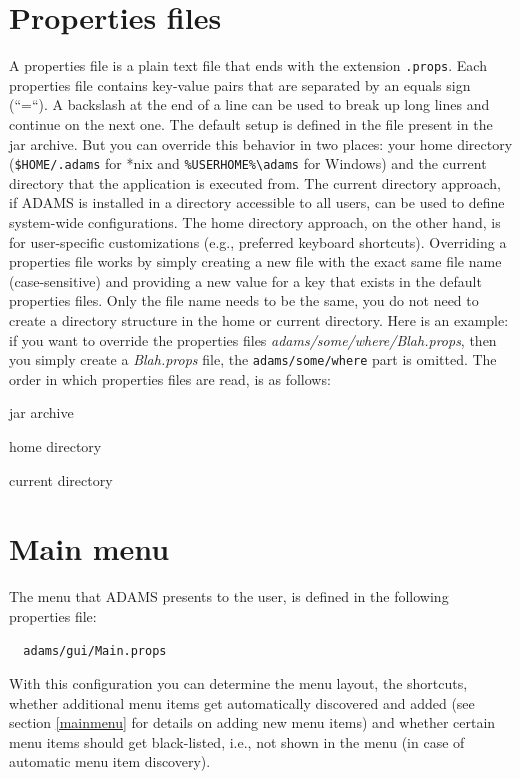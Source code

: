 \section{Properties files}
A properties file is a plain text file that ends with the extension
\texttt{.props}. Each properties file contains key-value pairs that are
separated by an equals sign (``=``). A backslash at the end of a line can be
used to break up long lines and continue on the next one. The default setup is
defined in the file present in the jar archive. But you can override this
behavior in two places:
your home directory (\texttt{\$HOME/.adams} for *nix and
\texttt{\%USERHOME\%\textbackslash adams} for Windows) and the current directory
that the application is executed from. The current directory approach, if ADAMS
is installed in a directory accessible to all users, can be used to define
system-wide configurations. The home directory approach, on the other hand, is
for user-specific customizations (e.g., preferred keyboard shortcuts).
Overriding a properties file works by simply creating a new file with the exact
same file name (case-sensitive) and providing a new value for a key that exists
in the default properties files. Only the file name needs to be the same, you do
not need to create a directory structure in the home or current directory.
Here is an example: if you want to override the properties files
\textit{adams/some/where/Blah.props}, then you simply create a
\textit{Blah.props} file, the \texttt{adams/some/where} part is omitted.
The order in which properties files are read, is as follows:
\begin{tight_enumerate}
	\item jar archive
	\item home directory
	\item current directory
\end{tight_enumerate}

\section{Main menu}
The menu that ADAMS presents to the user, is defined in the following properties
file:
\begin{verbatim}
  adams/gui/Main.props
\end{verbatim}
With this configuration you can determine the menu layout, the shortcuts, whether additional
menu items get automatically discovered and added (see section \ref{mainmenu} 
for details on adding new menu items) and whether certain menu items should
get black-listed, i.e., not shown in the menu (in case of automatic menu
item discovery).

